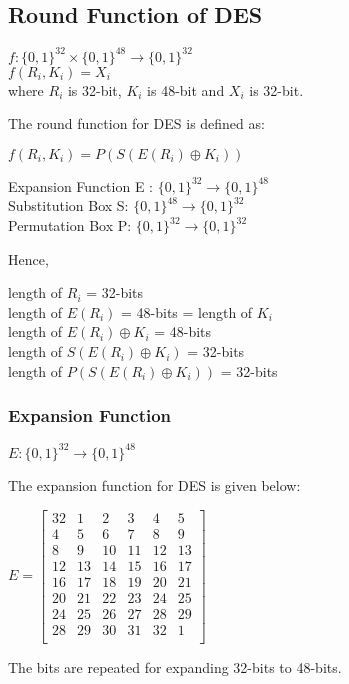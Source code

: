 \documentclass[11pt]{article}
\begin{document}
\subsection{Round Function of DES}
\begin{center}
    $f: \{0,1\}^{32} \times \{0,1\}^{48} \rightarrow \{0,1\}^{32}$\\
    $f(R_i, K_i) = X_i$\\
    where $R_i$ is 32-bit, $K_i$ is 48-bit and $X_i$ is 32-bit.
\end{center}
The round function for DES is defined as:
\begin{center}
    $f(R_i, K_i) = P(S(E(R_i) \oplus K_i))$\\
\end{center}
\begin{center}
    Expansion Function E : $\{0, 1\}^{32} \rightarrow \{0, 1\}^{48}$\\
    Substitution Box S: $\{0, 1\}^{48} \rightarrow \{0, 1\}^{32}$\\
    Permutation Box P: $\{0, 1\}^{32} \rightarrow \{0, 1\}^{32}$\\
\end{center}
Hence,
\begin{center}
    length of $R_i$ = 32-bits\\
    length of $E(R_i)$ = 48-bits = length of $K_i$\\
    length of $E(R_i) \oplus K_i$ = 48-bits\\
    length of $S(E(R_i) \oplus K_i)$ = 32-bits\\
    length of $P(S(E(R_i) \oplus K_i))$ = 32-bits
\end{center}

\subsubsection{Expansion Function}
\begin{center}
    $E: \{0, 1\}^{32} \rightarrow \{0, 1\}^{48}$\\    
\end{center}

The expansion function for DES is given below:
\begin{center}
    $ E = 
    \begin{bmatrix}
        32 & 1 & 2 & 3 & 4 & 5\\
        4 & 5 & 6 & 7 & 8 & 9\\
        8 & 9 & 10 & 11 & 12 & 13\\
        12 & 13 & 14 & 15 & 16 & 17\\
        16 & 17 & 18 & 19 & 20 & 21\\
        20 & 21 & 22 & 23 & 24 & 25\\
        24 & 25 & 26 & 27 & 28 & 29\\
        28 & 29 & 30 & 31 & 32 & 1\\
    \end{bmatrix}$
\end{center}
The bits are repeated for expanding 32-bits to 48-bits.
\end{document}

